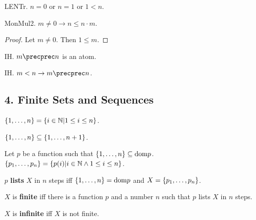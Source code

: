 \begin{axiom} LENTr. 
$n = 0$ or $n = 1$ or $1 < n$.\end{axiom}


\begin{lemma} MonMul2. $m \neq 0 \rightarrow n \leq n \cdot m$.
\end{lemma}
\begin{proof}
Let $m \neq 0$. Then $1 \leq m$.
\end{proof}

\begin{signature} IH. $m \precprec n$ is an atom.
\end{signature}

\begin{axiom} IH. $m < n \rightarrow m \precprec n$. \end{axiom}



\subsection{4. Finite Sets and Sequences}

\begin{definitionp} 
$\{1,\dots,n\} = \{ i \in {\Bbb N} | 1 \leq i \leq n \}$.
\end{definitionp}



\begin{lemmap}
$\{1,\dots,n\} \subseteq \{1,\dots,n+1\}$.
\end{lemmap}

\begin{definitionp} 
Let $p$ be a function such that 
$\{1,\dots,n\} \subseteq \text{dom} p$. 
$\{p_1,\dots,p_{n}\} = \{ p(i) | i \in {\Bbb N} \wedge 1 \leq i \leq n \}$.
\end{definitionp}

\begin{definitionp} $p$ {\bf lists} $X$ in $n$ steps iff 
$\{1,\dots,n\} = \text{dom} p$ and $X = \{p_1,\dots,p_{n}\}$.
\end{definitionp}

\begin{definitionp} $X$ is {\bf finite} iff there is a function
$p$ and a number $n$ such that $p$ lists $X$ in $n$ steps.
\end{definitionp}

\begin{definitionp} $X$ is {\bf infinite} iff $X$ is not finite.
\end{definitionp}

